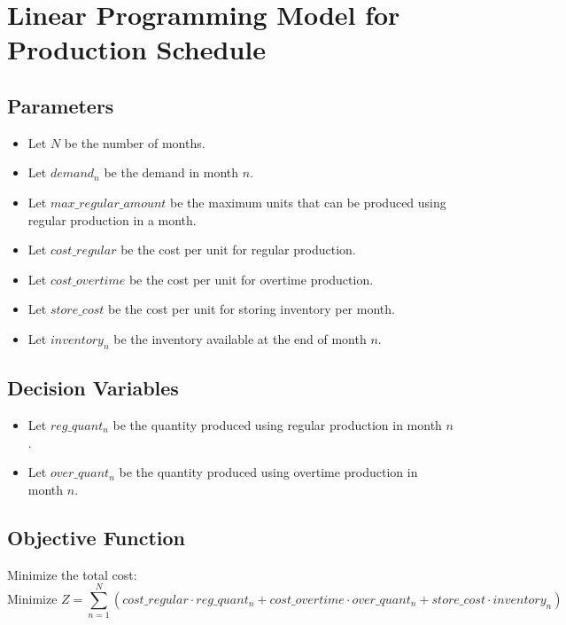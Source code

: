 \documentclass{article}
\begin{document}
\section*{Linear Programming Model for Production Schedule}

\subsection*{Parameters}
\begin{itemize}
    \item Let \( N \) be the number of months.
    \item Let \( demand_n \) be the demand in month \( n \).
    \item Let \( max\_regular\_amount \) be the maximum units that can be produced using regular production in a month.
    \item Let \( cost\_regular \) be the cost per unit for regular production.
    \item Let \( cost\_overtime \) be the cost per unit for overtime production.
    \item Let \( store\_cost \) be the cost per unit for storing inventory per month.
    \item Let \( inventory_n \) be the inventory available at the end of month \( n \).
    \end{itemize}

\subsection*{Decision Variables}
\begin{itemize}
    \item Let \( reg\_quant_n \) be the quantity produced using regular production in month \( n \).
    \item Let \( over\_quant_n \) be the quantity produced using overtime production in month \( n \).
    \end{itemize}

\subsection*{Objective Function}
Minimize the total cost:
\[
\text{Minimize } Z = \sum_{n=1}^{N} \left( cost\_regular \cdot reg\_quant_n + cost\_overtime \cdot over\_quant_n + store\_cost \cdot inventory_n \right)
\]
\end{document}
